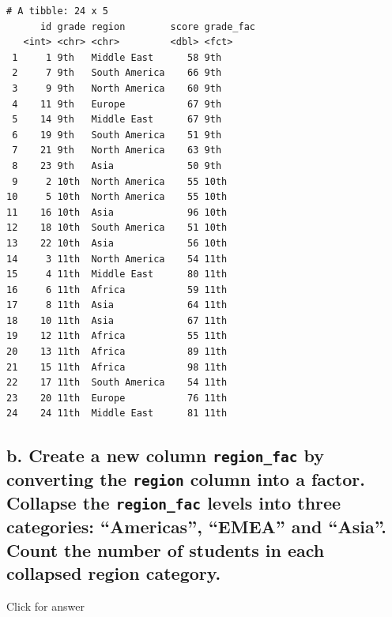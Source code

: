 \documentclass[
]{book}
\begin{document}
\begin{verbatim}
# A tibble: 24 x 5
      id grade region        score grade_fac
   <int> <chr> <chr>         <dbl> <fct>    
 1     1 9th   Middle East      58 9th      
 2     7 9th   South America    66 9th      
 3     9 9th   North America    60 9th      
 4    11 9th   Europe           67 9th      
 5    14 9th   Middle East      67 9th      
 6    19 9th   South America    51 9th      
 7    21 9th   North America    63 9th      
 8    23 9th   Asia             50 9th      
 9     2 10th  North America    55 10th     
10     5 10th  North America    55 10th     
11    16 10th  Asia             96 10th     
12    18 10th  South America    51 10th     
13    22 10th  Asia             56 10th     
14     3 11th  North America    54 11th     
15     4 11th  Middle East      80 11th     
16     6 11th  Africa           59 11th     
17     8 11th  Asia             64 11th     
18    10 11th  Asia             67 11th     
19    12 11th  Africa           55 11th     
20    13 11th  Africa           89 11th     
21    15 11th  Africa           98 11th     
22    17 11th  South America    54 11th     
23    20 11th  Europe           76 11th     
24    24 11th  Middle East      81 11th     
\end{verbatim}

\hypertarget{b.-create-a-new-column-region_fac-by-converting-the-region-column-into-a-factor.-collapse-the-region_fac-levels-into-three-categories-americas-emea-and-asia.-count-the-number-of-students-in-each-collapsed-region-category.}{%
\subsection{\texorpdfstring{b. Create a new column \texttt{region\_fac} by converting the \texttt{region} column into a factor. Collapse the \texttt{region\_fac} levels into three categories: ``Americas'', ``EMEA'' and ``Asia''. Count the number of students in each collapsed region category.}{b. Create a new column region\_fac by converting the region column into a factor. Collapse the region\_fac levels into three categories: ``Americas'', ``EMEA'' and ``Asia''. Count the number of students in each collapsed region category.}}\label{b.-create-a-new-column-region_fac-by-converting-the-region-column-into-a-factor.-collapse-the-region_fac-levels-into-three-categories-americas-emea-and-asia.-count-the-number-of-students-in-each-collapsed-region-category.}}

Click for answer
\end{document}
